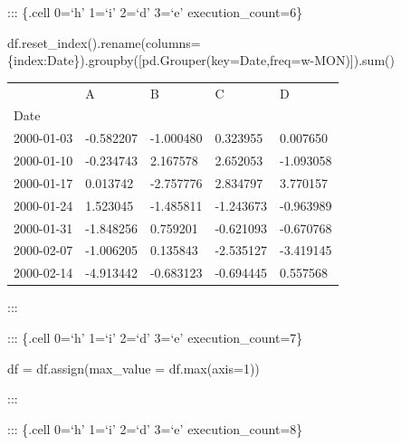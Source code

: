 \documentclass[
  letterpaper,
  DIV=11,
  numbers=noendperiod]{scrreport}
\newenvironment{Shaded}{\begin{snugshade}}{\end{snugshade}}
\newcommand{\BuiltInTok}[1]{\textcolor[rgb]{0.00,0.23,0.31}{#1}}
\newcommand{\DecValTok}[1]{\textcolor[rgb]{0.68,0.00,0.00}{#1}}
\newcommand{\NormalTok}[1]{\textcolor[rgb]{0.00,0.23,0.31}{#1}}
\newcommand{\OperatorTok}[1]{\textcolor[rgb]{0.37,0.37,0.37}{#1}}
\newcommand{\StringTok}[1]{\textcolor[rgb]{0.13,0.47,0.30}{#1}}
\begin{document}
::: \{.cell 0=`h' 1=`i' 2=`d' 3=`e' execution\_count=6\}

\begin{Shaded}
\begin{Highlighting}[]
\NormalTok{df.reset\_index().rename(columns}\OperatorTok{=}\NormalTok{\{}\StringTok{\textquotesingle{}index\textquotesingle{}}\NormalTok{:}\StringTok{\textquotesingle{}Date\textquotesingle{}}\NormalTok{\}).groupby([pd.Grouper(key}\OperatorTok{=}\StringTok{\textquotesingle{}Date\textquotesingle{}}\NormalTok{,freq}\OperatorTok{=}\StringTok{\textquotesingle{}w{-}MON\textquotesingle{}}\NormalTok{)]).}\BuiltInTok{sum}\NormalTok{()}
\end{Highlighting}
\end{Shaded}

\begin{longtable}[]{@{}lllll@{}}
\toprule()
& A & B & C & D \\
Date & & & & \\
\midrule()
\endhead
2000-01-03 & -0.582207 & -1.000480 & 0.323955 & 0.007650 \\
2000-01-10 & -0.234743 & 2.167578 & 2.652053 & -1.093058 \\
2000-01-17 & 0.013742 & -2.757776 & 2.834797 & 3.770157 \\
2000-01-24 & 1.523045 & -1.485811 & -1.243673 & -0.963989 \\
2000-01-31 & -1.848256 & 0.759201 & -0.621093 & -0.670768 \\
2000-02-07 & -1.006205 & 0.135843 & -2.535127 & -3.419145 \\
2000-02-14 & -4.913442 & -0.683123 & -0.694445 & 0.557568 \\
\bottomrule()
\end{longtable}

:::

::: \{.cell 0=`h' 1=`i' 2=`d' 3=`e' execution\_count=7\}

\begin{Shaded}
\begin{Highlighting}[]
\NormalTok{df }\OperatorTok{=}\NormalTok{ df.assign(max\_value }\OperatorTok{=}\NormalTok{ df.}\BuiltInTok{max}\NormalTok{(axis}\OperatorTok{=}\DecValTok{1}\NormalTok{))}
\end{Highlighting}
\end{Shaded}

:::

::: \{.cell 0=`h' 1=`i' 2=`d' 3=`e' execution\_count=8\}
\end{document}
